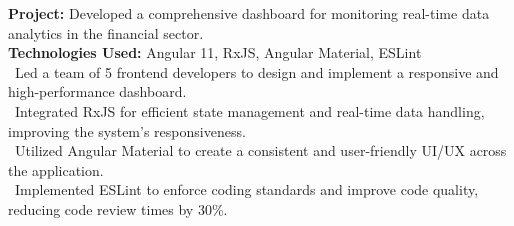 \textbf{Project:} Developed a comprehensive dashboard for monitoring real-time data analytics in the financial sector. \\
\textbf{Technologies Used:} Angular 11, RxJS, Angular Material, ESLint \\
\hspace*{4pt}\textbullet\content~Led a team of 5 frontend developers to design and implement a responsive and high-performance dashboard. \\
\hspace*{4pt}\textbullet\content~Integrated RxJS for efficient state management and real-time data handling, improving the system's responsiveness. \\
\hspace*{4pt}\textbullet\content~Utilized Angular Material to create a consistent and user-friendly UI/UX across the application. \\
\hspace*{4pt}\textbullet\content~Implemented ESLint to enforce coding standards and improve code quality, reducing code review times by 30\%. \\

